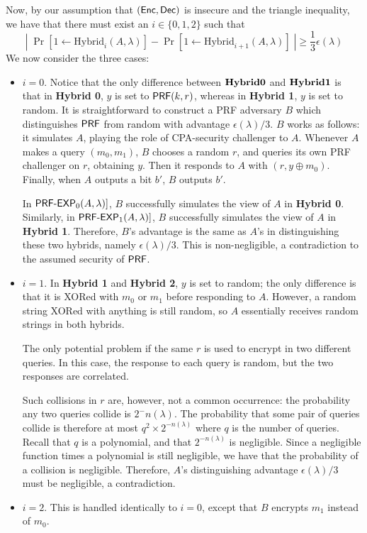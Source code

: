 Now, by our assumption that $({\sf Enc},{\sf Dec})$ is insecure and the triangle inequality, we have that there must exist an $i\in\{0,1,2\}$ such that 
\[|\;\Pr[1\gets\text{Hybrid}_i(A,\lambda)]-\Pr[1\gets\text{Hybrid}_{i+1}(A,\lambda)]\;|\geq \frac{1}{3}\epsilon(\lambda)\]
We now consider the three cases:
\begin{itemize}
	\item $i=0$.  Notice that the only difference between ${\bf Hybrid 0}$ and ${\bf Hybrid 1}$ is that in {\bf Hybrid 0}, $y$ is set to ${\sf PRF}(k,r)$, whereas in {\bf Hybrid 1}, $y$ is set to random.  It is straightforward to construct a PRF adversary $B$ which distinguishes ${\sf PRF}$ from random with advantage $\epsilon(\lambda)/3$.  $B$ works as follows: it simulates $A$, playing the role of CPA-security challenger to $A$.  Whenever $A$ makes a query $(m_0,m_1)$, $B$ chooses a random $r$, and queries its own PRF challenger on $r$, obtaining $y$.  Then it responds to $A$ with $(r,y\oplus m_0)$.  Finally, when $A$ outputs a bit $b'$, $B$ outputs $b'$.
	
	In $\text{\sf PRF-EXP}_0(A,\lambda)]$, $B$ successfully simulates the view of $A$ in {\bf Hybrid 0}.  Similarly, in $\text{\sf PRF-EXP}_1(A,\lambda)]$, $B$ successfully simulates the view of $A$ in {\bf Hybrid 1}.  Therefore, $B$'s advantage is the same as $A$'s in distinguishing these two hybrids, namely $\epsilon(\lambda)/3$.  This is non-negligible, a contradiction to the assumed security of ${\sf PRF}$.
	
	\item $i=1$.  In {\bf Hybrid 1} and {\bf Hybrid 2}, $y$ is set to random; the only difference is that it is XORed with $m_0$ or $m_1$ before responding to $A$.  However, a random string XORed with anything is still random, so $A$ essentially receives random strings in both hybrids.
	
	The only potential problem if the same $r$ is used to encrypt in two different queries.  In this case, the response to each query is random, but the two responses are correlated.  
	
	Such collisions in $r$ are, however, not a common occurrence: the probability any two queries collide is $2^-n(\lambda)$.  The probability that some pair of queries collide is therefore at most $q^2\times 2^{-n(\lambda)}$ where $q$ is the number of queries.  Recall that $q$ is a polynomial, and that $2^{-n(\lambda)}$ is negligible.  Since a negligible function times a polynomial is still negligible, we have that the probability of a collision is negligible.  Therefore, $A$'s distinguishing advantage $\epsilon(\lambda)/3$ must be negligible, a contradiction.
	\item $i=2$.  This is handled identically to $i=0$, except that $B$ encrypts $m_1$ instead of $m_0$.
\end{itemize}

